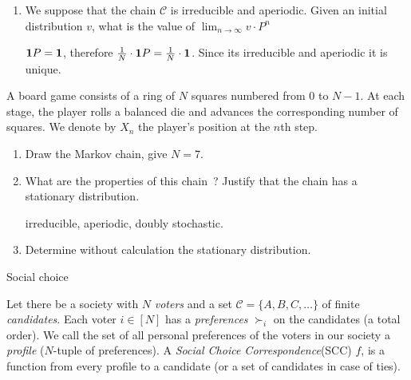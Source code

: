 \documentclass[a4paper,11pt]{exam}
\begin{document}
\begin{questions}
\begin{enumerate}
	\item We suppose that the chain $ \mathcal{C} $ is irreducible and aperiodic.
	Given an initial distribution $v$, what is the value of $\lim_{n\rightarrow\infty}v\cdot P^n$
	\begin{solution}
		${\bf 1}P={\bf 1}$, therefore $\frac{1}{N}\cdot{\bf 1}P=\frac{1}{N}\cdot{\bf 1}$. Since its irreducible and aperiodic it is unique.
	\end{solution}
\end{enumerate}
%
\question
A board game consists of a ring of $ N $ squares numbered from $ 0 $ to $ N-1 $.
At each stage, the player rolls a balanced die and advances the corresponding number of squares.
We denote by $ X_n $ the player's position at the $n$th step.
\begin{enumerate}
	\item Draw the Markov chain, give $N=7$.
	\item What are the properties of this chain~? Justify that the chain has a stationary distribution.
	\begin{solution}
		irreducible, aperiodic, doubly stochastic.
	\end{solution}
	\item Determine without calculation the stationary distribution.
\end{enumerate}


\begin{EnvFullwidth}
	\colorbox{gris}{
		\begin{minipage}[c]{\textwidth}
			Social choice
		\end{minipage}
	}
\end{EnvFullwidth}

Let there be a society with $N$ \emph{voters} and a set  $\mathcal{C}=\{A,B,C,\ldots\}$ of finite \emph{candidates}. Each voter $i\in[N]$ has a \emph{preferences} $\succ_i$ on the candidates (a total order). We call the set of all personal preferences of the voters in our society a \emph{profile} ($N$-tuple of preferences).
A \emph{Social Choice Correspondence}(SCC) $f$, is a function from every profile to a candidate (or a set of candidates in case of ties).


\end{questions}
\end{document}
